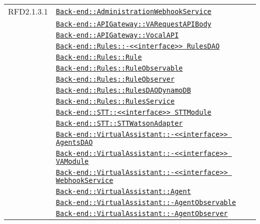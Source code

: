 \begin{longtable}{|>{\centering}m{3cm}|m{10cm}<{\centering}|}
RFD2.1.3.1 & \hyperref[Back-end::AdministrationWebhookService]{\texttt{Back-end::AdministrationWebhookService}}\\
& \hyperref[Back-end::APIGateway::VARequestAPIBody]{\texttt{Back-end::APIGateway::VARequestAPIBody}}\\
& \hyperref[Back-end::APIGateway::VocalAPI]{\texttt{Back-end::APIGateway::VocalAPI}}\\
& \hyperref[Back-end::Rules::<<interface>> RulesDAO]{\texttt{Back-end::Rules::-\linebreak <<interface>> RulesDAO}}\\
& \hyperref[Back-end::Rules::Rule]{\texttt{Back-end::Rules::Rule}}\\
& \hyperref[Back-end::Rules::RuleObservable]{\texttt{Back-end::Rules::RuleObservable}}\\
& \hyperref[Back-end::Rules::RuleObserver]{\texttt{Back-end::Rules::RuleObserver}}\\
& \hyperref[Back-end::Rules::RulesDAODynamoDB]{\texttt{Back-end::Rules::RulesDAODynamoDB}}\\
& \hyperref[Back-end::Rules::RulesService]{\texttt{Back-end::Rules::RulesService}}\\
& \hyperref[Back-end::STT::<<interface>> STTModule]{\texttt{Back-end::STT::<<interface>> STTModule}}\\
& \hyperref[Back-end::STT::STTWatsonAdapter]{\texttt{Back-end::STT::STTWatsonAdapter}}\\
& \hyperref[Back-end::VirtualAssistant::<<interface>> AgentsDAO]{\texttt{Back-end::VirtualAssistant::-\linebreak <<interface>> AgentsDAO}}\\
& \hyperref[Back-end::VirtualAssistant::<<interface>> VAModule]{\texttt{Back-end::VirtualAssistant::-\linebreak <<interface>> VAModule}}\\
& \hyperref[Back-end::VirtualAssistant::<<interface>> WebhookService]{\texttt{Back-end::VirtualAssistant::-\linebreak <<interface>> WebhookService}}\\
& \hyperref[Back-end::VirtualAssistant::Agent]{\texttt{Back-end::VirtualAssistant::Agent}}\\
& \hyperref[Back-end::VirtualAssistant::AgentObservable]{\texttt{Back-end::VirtualAssistant::-\linebreak AgentObservable}}\\
& \hyperref[Back-end::VirtualAssistant::AgentObserver]{\texttt{Back-end::VirtualAssistant::-\linebreak AgentObserver}}\\

\end{longtable}
